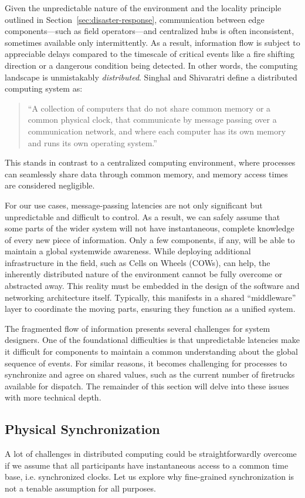 \documentclass[]             %
{NASA}                       %
\theoremstyle{definition}
\begin{document}
Given the unpredictable nature of the environment and the locality
principle outlined in Section~\ref{sec:disaster-response},
communication between edge components---such as field operators---and
centralized hubs is often inconsistent, sometimes available only
intermittently. As a result, information flow is subject to
appreciable delays compared to the timescale of critical events like a
fire shifting direction or a dangerous condition being detected. In
other words, the computing landscape is unmistakably
\emph{distributed}. Singhal and Shivaratri \cite{10.5555/562065}
define a distributed computing system as:
\begin{quote}
  ``A collection of computers that do not share common
  memory or a common physical clock, that communicate by message
  passing over a communication network, and where each computer has
  its own memory and runs its own operating system.''
\end{quote}
This stands in contrast to a centralized computing environment, where
processes can seamlessly share data through common memory, and memory
access times are considered negligible.

For our use cases, message-passing latencies are not only significant
but unpredictable and difficult to control. As a result, we can safely
assume that some parts of the wider system will not have
instantaneous, complete knowledge of every new piece of
information. Only a few components, if any, will be able to maintain a
global systemwide awareness. While deploying additional infrastructure
in the field, such as Cells on Wheels (COWs), can help, the inherently
distributed nature of the environment cannot be fully overcome or
abstracted away. This reality must be embedded in the design of the
software and networking architecture itself. Typically, this manifests
in a shared ``middleware'' layer to coordinate the moving parts,
ensuring they function as a unified system.

The fragmented flow of information presents several challenges for
system designers. One of the foundational difficulties is that
unpredictable latencies make it difficult for components to maintain a
common understanding about the global sequence of events. For similar
reasons, it becomes challenging for processes to synchronize and agree
on shared values, such as the current number of firetrucks available
for dispatch. The remainder of this section will delve into these
issues with more technical depth.

\subsection{Physical Synchronization}
\label{ssec:physical-synchronization}
A lot of challenges in distributed computing could be
straightforwardly overcome if we assume that all participants have
instantaneous access to a common time base, i.e.  synchronized
clocks. Let us explore why fine-grained synchronization is not a
tenable assumption for all purposes.
\end{document}

